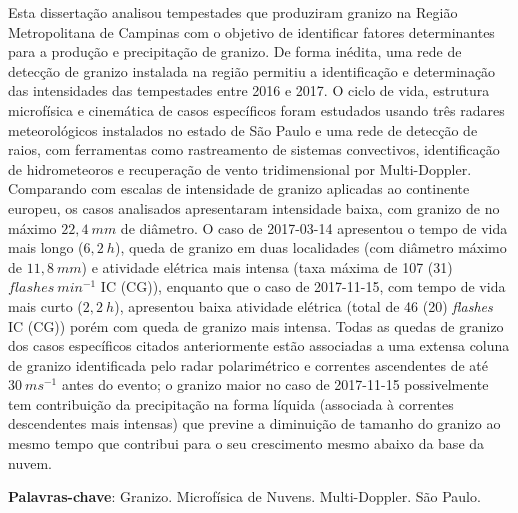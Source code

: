 
\setlength{\absparsep}{18pt} %
\begin{resumo}
 Esta dissertação analisou tempestades que produziram granizo na Região Metropolitana de Campinas com o objetivo de identificar fatores determinantes para a produção e precipitação de granizo. De forma inédita, uma rede de detecção de granizo instalada na região permitiu a identificação e determinação das intensidades das tempestades entre 2016 e 2017. O ciclo de vida, estrutura microfísica e cinemática de casos específicos foram estudados usando três radares meteorológicos instalados no estado de São Paulo e uma rede de detecção de raios, com ferramentas como rastreamento de sistemas convectivos, identificação de hidrometeoros e recuperação de vento tridimensional por Multi-Doppler. Comparando com escalas de intensidade de granizo aplicadas ao continente europeu, os casos analisados apresentaram intensidade baixa, com granizo de no máximo $22,4\:mm$ de diâmetro. O caso de 2017-03-14 apresentou o tempo de vida mais longo ($6,2\:h$), queda de granizo em duas localidades (com diâmetro máximo de $11,8\:mm$) e atividade elétrica mais intensa (taxa máxima de 107 (31) $flashes\:min^{-1}$ IC (CG)), enquanto que o caso de 2017-11-15, com tempo de vida mais curto ($2,2\:h$), apresentou baixa atividade elétrica (total de 46 (20) \textit{flashes} IC (CG)) porém com queda de granizo mais intensa. Todas as quedas de granizo dos casos específicos citados anteriormente estão associadas a uma extensa coluna de granizo identificada pelo radar polarimétrico e correntes ascendentes de até $30\:ms^{-1}$ antes do evento; o granizo maior no caso de 2017-11-15 possivelmente tem contribuição da precipitação na forma líquida (associada à correntes descendentes mais intensas) que previne a diminuição de tamanho do granizo ao mesmo tempo que contribui para o seu crescimento mesmo abaixo da base da nuvem.

 \textbf{Palavras-chave}: Granizo. Microfísica de Nuvens. Multi-Doppler. São Paulo.
\end{resumo}


